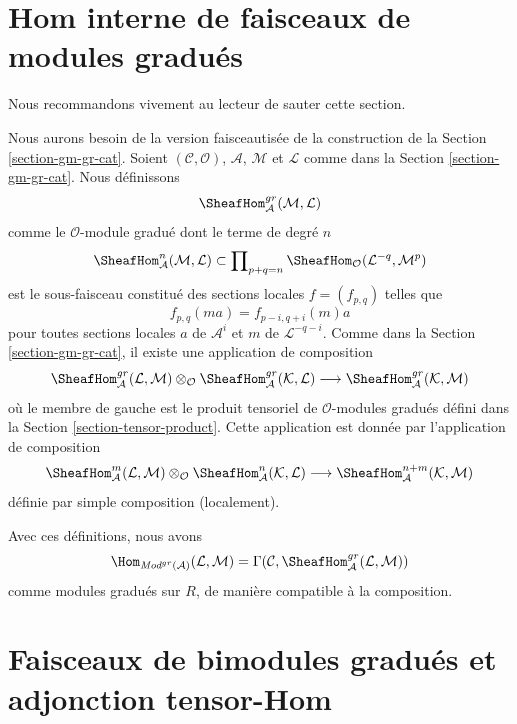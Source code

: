 \section{Hom interne de faisceaux de modules gradués}
\label{section-internal-hom-graded}

\noindent
Nous recommandons vivement au lecteur de sauter cette section.

\medskip\noindent
Nous aurons besoin de la version faisceautisée de la construction de la
Section \ref{section-gm-gr-cat}. Soient
$(\mathcal{C}, \mathcal{O})$, $\mathcal{A}$, $\mathcal{M}$ et $\mathcal{L}$
comme dans la Section \ref{section-gm-gr-cat}. Nous définissons
$$
\SheafHom^{gr}_\mathcal{A}(\mathcal{M}, \mathcal{L})
$$
comme le $\mathcal{O}$-module gradué dont le terme de degré $n$
$$
\SheafHom^n_\mathcal{A}(\mathcal{M}, \mathcal{L})
\subset
\prod\nolimits_{p + q = n}
\SheafHom_\mathcal{O}(\mathcal{L}^{-q}, \mathcal{M}^p)
$$
est le sous-faisceau constitué des sections locales $f = (f_{p, q})$ telles que
$$
f_{p, q}(m a) = f_{p - i, q + i}(m)a
$$
pour toutes sections locales $a$ de $\mathcal{A}^i$ et $m$ de
$\mathcal{L}^{-q - i}$. Comme dans la Section \ref{section-gm-gr-cat},
il existe une application de composition
$$
\SheafHom^{gr}_\mathcal{A}(\mathcal{L}, \mathcal{M}) \otimes_\mathcal{O}
\SheafHom^{gr}_\mathcal{A}(\mathcal{K}, \mathcal{L})
\longrightarrow
\SheafHom^{gr}_\mathcal{A}(\mathcal{K}, \mathcal{M})
$$
où le membre de gauche est le produit tensoriel de $\mathcal{O}$-modules
gradués défini dans la Section \ref{section-tensor-product}.
Cette application est donnée par l'application de composition
$$
\SheafHom^m_\mathcal{A}(\mathcal{L}, \mathcal{M}) \otimes_\mathcal{O}
\SheafHom^n_\mathcal{A}(\mathcal{K}, \mathcal{L}) \longrightarrow
\SheafHom^{n + m}_\mathcal{A}(\mathcal{K}, \mathcal{M})
$$
définie par simple composition (localement).

\medskip\noindent
Avec ces définitions, nous avons
$$
\Hom_{\textit{Mod}^{gr}(\mathcal{A})}(\mathcal{L}, \mathcal{M}) =
\Gamma(\mathcal{C}, \SheafHom^{gr}_\mathcal{A}(\mathcal{L}, \mathcal{M}))
$$
comme modules gradués sur $R$, de manière compatible à la composition.






\section{Faisceaux de bimodules gradués et adjonction tensor-Hom}
\label{section-graded-bimodules}

